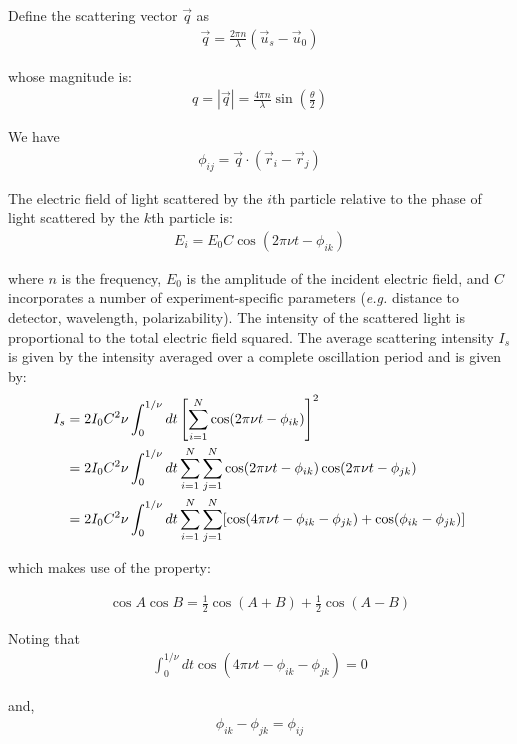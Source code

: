 \documentclass[book.tex]{subfiles}
\begin{document}
Define the scattering vector $\vec{q}$ as
\begin{align}
\vec{q} = \frac{2\pi n}{\lambda}(\vec{u}_s - \vec{u}_0)
\end{align}

whose magnitude is:
\begin{align}
q = |\vec{q}| = \frac{4\pi n}{\lambda}\sin\left(\frac{\theta}{2}\right)
\end{align}

We have
\begin{align}
\phi_{ij} = \vec{q}\cdot (\vec{r}_i - \vec{r}_j)
\end{align}

The electric field of light scattered by the $i$th particle relative to the phase of light scattered by the $k$th particle is:
\begin{align}\label{Eq16}
E_i = E_0C \cos(2\pi\nu t - \phi _{ik})
\end{align}

where $n$ is the frequency, $E_0$ is the amplitude of the incident electric field, and $C$ incorporates a number of experiment-specific parameters (\textit{e.g.} distance to detector, wavelength, polarizability).
The intensity of the scattered light is proportional to the total electric field squared. The average scattering intensity $I_s$ is given by the intensity averaged over a complete oscillation period and is given by:
\begin{align}\label{Eq17}
I_s &= 2I_0C^2\nu\int_0^{1/\nu}dt\left[ \sum_{i=1}^N\cos(2\pi\nu t - \phi_{ik}) \right]^2 \notag\\
&= 2I_0C^2\nu\int_0^{1/\nu}dt \sum_{i=1}^N \sum_{j=1}^N\cos(2\pi\nu t - \phi_{ik})\cos(2\pi\nu t - \phi_{jk}) \notag\\
&= 2I_0C^2\nu\int_0^{1/\nu}dt \sum_{i=1}^N \sum_{j=1}^N[\cos(4\pi\nu t - \phi_{ik}- \phi_{jk}) + \cos(\phi_{ik}- \phi_{jk})]
\end{align}

which makes use of the property:

\begin{align}
\cos A \cos B = \frac{1}{2}\cos(A + B) + \frac{1}{2}\cos (A- B)
\end{align}

Noting that
\begin{align}\label{Eq19}
\int_0^{1/\nu}dt\cos(4\pi\nu t - \phi_{ik} - \phi_{jk}) =0
\end{align}

and,
\begin{align}\label{Eq20}
\phi_{ik} - \phi_{jk} = \phi_{ij}
\end{align}
\end{document}

